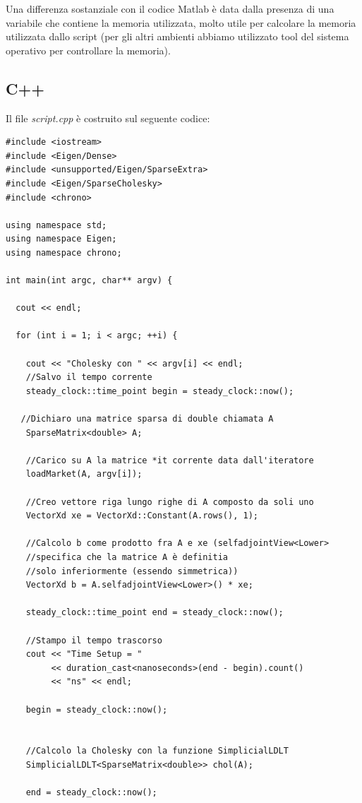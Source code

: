 \documentclass[preprint,12pt]{elsarticle}
\begin{document}
Una differenza sostanziale con il codice Matlab è data dalla presenza di una variabile che contiene la memoria utilizzata, molto utile per calcolare la memoria utilizzata dallo script (per gli altri ambienti abbiamo utilizzato tool del sistema operativo per controllare la memoria).

\subsection{C++}

Il file \textit{script.cpp} è costruito sul seguente codice:

\begin{verbatim}
#include <iostream>
#include <Eigen/Dense>
#include <unsupported/Eigen/SparseExtra>
#include <Eigen/SparseCholesky>
#include <chrono>

using namespace std;
using namespace Eigen;
using namespace chrono;

int main(int argc, char** argv) {	

  cout << endl;

  for (int i = 1; i < argc; ++i) {

    cout << "Cholesky con " << argv[i] << endl;		
    //Salvo il tempo corrente
    steady_clock::time_point begin = steady_clock::now();

   //Dichiaro una matrice sparsa di double chiamata A
    SparseMatrix<double> A;

    //Carico su A la matrice *it corrente data dall'iteratore
    loadMarket(A, argv[i]);

    //Creo vettore riga lungo righe di A composto da soli uno
    VectorXd xe = VectorXd::Constant(A.rows(), 1);

    //Calcolo b come prodotto fra A e xe (selfadjointView<Lower>
    //specifica che la matrice A è definitia
    //solo inferiormente (essendo simmetrica))
    VectorXd b = A.selfadjointView<Lower>() * xe;

    steady_clock::time_point end = steady_clock::now();

    //Stampo il tempo trascorso
    cout << "Time Setup = " 
         << duration_cast<nanoseconds>(end - begin).count() 
         << "ns" << endl;
         
    begin = steady_clock::now();


    //Calcolo la Cholesky con la funzione SimplicialLDLT
    SimplicialLDLT<SparseMatrix<double>> chol(A);

    end = steady_clock::now();
    

\end{verbatim}
\end{document}
